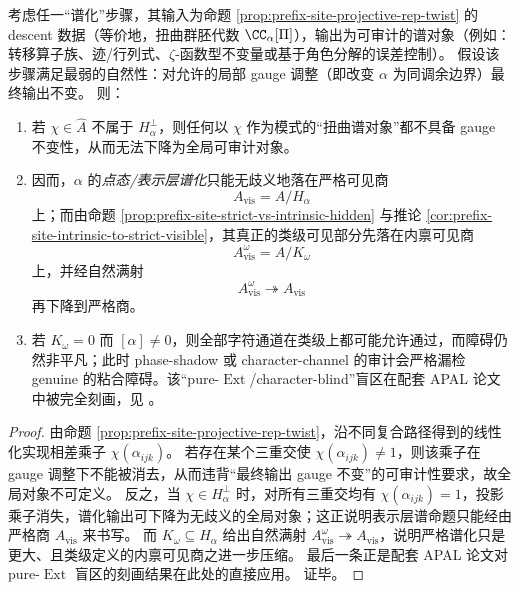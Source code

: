 \begin{theorem}\label{thm:prefix-site-spectral-definability-avis}
考虑任一“谱化”步骤，其输入为命题 \ref{prop:prefix-site-projective-rep-twist} 的 descent 数据（等价地，扭曲群胚代数 \(\CC_\alpha[\Pi]\)），输出为可审计的谱对象（例如：转移算子族、迹/行列式、\(\zeta\)-函数型不变量或基于角色分解的误差控制）。
假设该步骤满足最弱的自然性：对允许的局部 gauge 调整（即改变 \(\alpha\) 为同调余边界）最终输出不变。
则：
\begin{enumerate}
  \item 若 \(\chi\in\widehat A\) 不属于 \(H_\alpha^\perp\)，则任何以 \(\chi\) 作为模式的“扭曲谱对象”都不具备 gauge 不变性，从而无法下降为全局可审计对象。
  \item 因而，\(\alpha\) 的\emph{点态/表示层谱化}只能无歧义地落在严格可见商
  \[
  A_{\mathrm{vis}}=A/H_\alpha
  \]
  上；而由命题 \ref{prop:prefix-site-strict-vs-intrinsic-hidden} 与推论 \ref{cor:prefix-site-intrinsic-to-strict-visible}，其真正的类级可见部分先落在内禀可见商
  \[
  A_{\mathrm{vis}}^\omega=A/K_\omega
  \]
  上，并经自然满射
  \[
  A_{\mathrm{vis}}^\omega\twoheadrightarrow A_{\mathrm{vis}}
  \]
  再下降到严格商。
  \item 若 \(K_\omega=0\) 而 \([\alpha]\neq 0\)，则全部字符通道在类级上都可能允许通过，而障碍仍然非平凡；此时 phase-shadow 或 character-channel 的审计会严格漏检 genuine 的粘合障碍。该“pure-\(\operatorname{Ext}\)/character-blind”盲区在配套 APAL 论文中被完全刻画，见 \cite{MaZhang2026StateForcingSemantics}。
\end{enumerate}
\end{theorem}

\begin{proof}
由命题 \ref{prop:prefix-site-projective-rep-twist}，沿不同复合路径得到的线性化实现相差乘子 \(\chi(\alpha_{ijk})\)。
若存在某个三重交使 \(\chi(\alpha_{ijk})\neq 1\)，则该乘子在 gauge 调整下不能被消去，从而违背“最终输出 gauge 不变”的可审计性要求，故全局对象不可定义。
反之，当 \(\chi\in H_\alpha^\perp\) 时，对所有三重交均有 \(\chi(\alpha_{ijk})=1\)，投影乘子消失，谱化输出可下降为无歧义的全局对象；这正说明表示层谱命题只能经由严格商 \(A_{\mathrm{vis}}\) 来书写。
而 \(K_\omega\subseteq H_\alpha\) 给出自然满射 \(A_{\mathrm{vis}}^\omega\twoheadrightarrow A_{\mathrm{vis}}\)，说明严格谱化只是更大、且类级定义的内禀可见商之进一步压缩。
最后一条正是配套 APAL 论文对 pure-\(\operatorname{Ext}\) 盲区的刻画结果在此处的直接应用。
证毕。
\end{proof}


